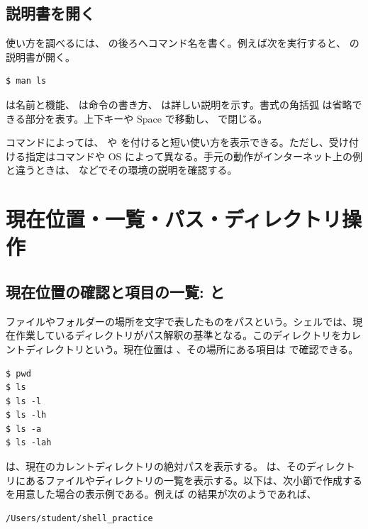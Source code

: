 \subsection{説明書を開く}

使い方を調べるには、 の後ろへコマンド名を書く。例えば次を実行すると、 の説明書が開く。

\begin{lstlisting}[numbers=none, xleftmargin=2\zw]
$ man ls
\end{lstlisting}

 は名前と機能、 は命令の書き方、 は詳しい説明を示す。書式の角括弧 \code{[...]} は省略できる部分を表す。上下キーや Space で移動し、 で閉じる。

コマンドによっては、 や  を付けると短い使い方を表示できる。ただし、受け付ける指定はコマンドや OS によって異なる。手元の動作がインターネット上の例と違うときは、 などでその環境の説明を確認する。

\section{現在位置・一覧・パス・ディレクトリ操作}

\subsection{現在位置の確認と項目の一覧:  と }

ファイルやフォルダーの場所を文字で表したものをパスという。シェルでは、現在作業しているディレクトリがパス解釈の基準となる。このディレクトリをカレントディレクトリという。現在位置は 、その場所にある項目は  で確認できる。

\begin{lstlisting}[numbers=none, xleftmargin=2\zw]
$ pwd
$ ls
$ ls -l
$ ls -lh
$ ls -a
$ ls -lah
\end{lstlisting}

 は、現在のカレントディレクトリの絶対パスを表示する。 は、そのディレクトリにあるファイルやディレクトリの一覧を表示する。以下は、次小節で作成する  を用意した場合の表示例である。例えば  の結果が次のようであれば、

\begin{lstlisting}[numbers=none, xleftmargin=2\zw]
/Users/student/shell_practice
\end{lstlisting}

